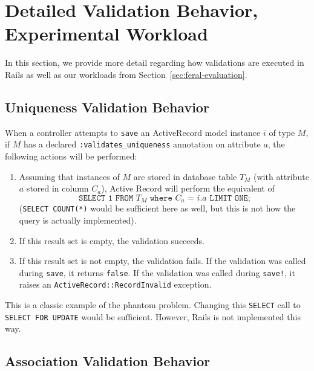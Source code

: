 \section{Detailed Validation Behavior, Experimental Workload}
\label{sec:feral-details}

In this section, we provide more detail regarding how validations are
executed in Rails as well as our workloads from Section~\ref{sec:feral-evaluation}.

\subsection{Uniqueness Validation Behavior}
\label{sec:appendix-uniqueness-behavior}

When a controller attempts to \texttt{save} an ActiveRecord model instance $i$ of type $M$, if $M$ has a declared \texttt{:validates\_uniqueness} annotation on attribute $a$, the following actions will be performed:

\begin{enumerate} 
\small

\item Assuming that instances of $M$ are stored in database table $T_M$ (with attribute $a$ stored in column $C_a$), Active Record will perform the equivalent of $$\texttt{SELECT 1 FROM $T_M$ where $C_a$ = $i.a$ LIMIT ONE;}$$ (\texttt{SELECT COUNT(*)} would be sufficient here as well, but this is not how the query is actually implemented).

\item If this result set is empty, the validation succeeds.

\item If this result set is not empty, the validation fails. If the validation was called during \texttt{save}, it returns \texttt{false}. If the validation was called during \texttt{save!}, it raises an \texttt{ActiveRecord::RecordInvalid} exception.

\end{enumerate}

This is a classic example of the phantom problem. Changing this \texttt{SELECT} call to \texttt{SELECT FOR UPDATE} would be sufficient. However, Rails is not implemented this way.

\subsection{Association Validation Behavior}
\label{sec:appendix-association-behavior}

